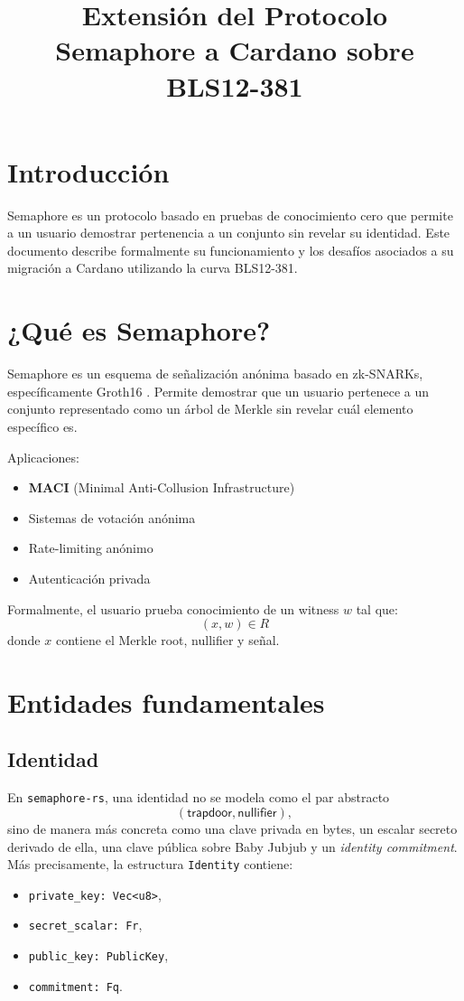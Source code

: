 \documentclass[11pt,a4paper]{article}
\title{Extensión del Protocolo Semaphore a Cardano sobre BLS12-381}
\author{}
\date{}
\begin{document}
	
	\maketitle
	
	\section{Introducción}
	
	Semaphore es un protocolo basado en pruebas de conocimiento cero que permite a un usuario demostrar pertenencia a un conjunto sin revelar su identidad. Este documento describe formalmente su funcionamiento y los desafíos asociados a su migración a Cardano utilizando la curva BLS12-381.
	
	\section{¿Qué es Semaphore?}
	
	Semaphore \cite{semaphore} es un esquema de señalización anónima basado en zk-SNARKs, específicamente Groth16 \cite{groth16}. Permite demostrar que un usuario pertenece a un conjunto representado como un árbol de Merkle sin revelar cuál elemento específico es.
	
	Aplicaciones:
	\begin{itemize}
		\item \textbf{MACI} (Minimal Anti-Collusion Infrastructure) \cite{maci}
		\item Sistemas de votación anónima
		\item Rate-limiting anónimo
		\item Autenticación privada
	\end{itemize}
	
	Formalmente, el usuario prueba conocimiento de un witness $w$ tal que:
	\[
	(x, w) \in R
	\]
	donde $x$ contiene el Merkle root, nullifier y señal.
	
	\section{Entidades fundamentales}
	
	\subsection{Identidad}
	
	En \texttt{semaphore-rs}, una identidad no se modela como el par abstracto
	\[
	(\mathsf{trapdoor}, \mathsf{nullifier}),
	\]
	sino de manera más concreta como una clave privada en bytes, un escalar secreto derivado de ella, una clave pública sobre Baby Jubjub y un \emph{identity commitment}. Más precisamente, la estructura \texttt{Identity} contiene:
	\begin{itemize}
		\item \texttt{private\_key: Vec<u8>},
		\item \texttt{secret\_scalar: Fr},
		\item \texttt{public\_key: PublicKey},
		\item \texttt{commitment: Fq}.
	\end{itemize}
	
\end{document}
